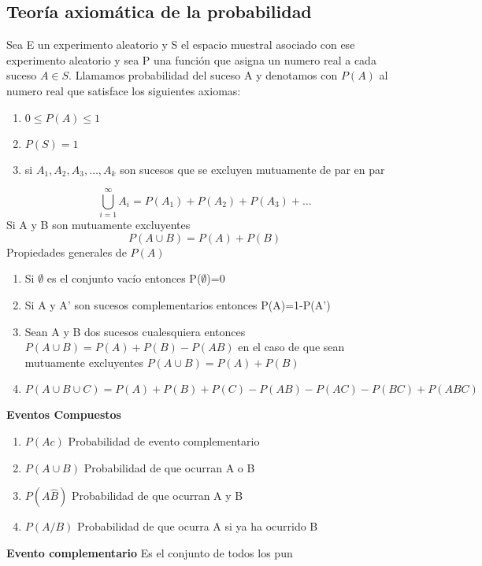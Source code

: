 \documentclass[10pt,a4paper]{article}
\begin{document}
\subsection{Teoría axiomática de la probabilidad}
Sea E un experimento aleatorio y S el espacio muestral asociado con ese experimento aleatorio y sea P una función que asigna un numero real a cada suceso $A\in S$. Llamamos probabilidad del suceso A y denotamos con $P(A)$ al numero real que satisface los siguientes axiomas:
\begin{enumerate}
	\item $0\leq P(A)\leq 1$
	\item $P(S)=1$
	\item si $A_1,A_2,A_3,\dots,A_k$ son sucesos que se excluyen mutuamente de par en par
\end{enumerate}
\begin{equation}
	\bigcup\limits_{i=1}^{\infty} A_{i} = P(A_1)+P(A_2)+P(A_3)+\dots
\end{equation}
Si A y B son mutuamente excluyentes
\begin{equation}
	P(A\cup B)=P(A)+P(B)
\end{equation}
Propiedades generales de $P(A)$
\begin{enumerate}
	\item Si $\emptyset$ es el conjunto vacío entonces P($\emptyset$)=0
	\item Si A y A' son sucesos complementarios entonces P(A)=1-P(A')
	\item Sean A y B dos sucesos cualesquiera entonces $P(A\cup B)=P(A)+P(B)-P(AB)$ en el caso de que sean mutuamente excluyentes $P(A\cup B)=P(A)+P(B)$
	\item $P(A\cup B\cup C)=P(A)+P(B)+P(C)-P(AB)-P(AC)-P(BC)+P(ABC)$
\end{enumerate}

\textbf{Eventos Compuestos}
\begin{enumerate}
	\item $P(Ac)$ Probabilidad de evento complementario
	\item $P(A\cup B)$ Probabilidad de que ocurran A o B
	\item $P(A\hat B)$ Probabilidad de que ocurran A y B
	\item $P(A/B)$ Probabilidad de que ocurra A si ya ha ocurrido B
\end{enumerate}

\textbf{Evento complementario}
Es el conjunto de todos los pun
\end{document}
